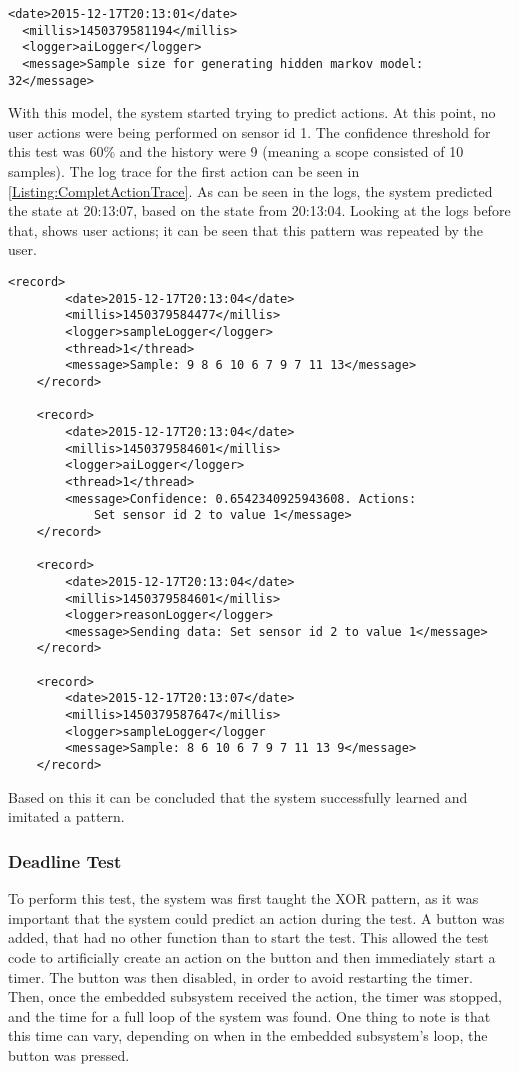\lstset{language=xml}
\begin{lstlisting}[label = Listing:MarkovGenLog, caption = Snippet of log from model generation]
  <date>2015-12-17T20:13:01</date>
  <millis>1450379581194</millis>
  <logger>aiLogger</logger>
  <message>Sample size for generating hidden markov model: 32</message>
\end{lstlisting}

With this model, the system started trying to predict actions. At this point, no user actions were being performed on sensor id 1. The confidence threshold for this test was 60\% and the history were 9 (meaning a scope consisted of 10 samples). The log trace for the first action can be seen in \cref{Listing:CompletActionTrace}. As can be seen in the logs, the system predicted the state at 20:13:07, based on the state from 20:13:04. Looking at the logs before that, shows user actions; it can be seen that this pattern was repeated by the user.

\begin{lstlisting}[label = Listing:CompletActionTrace, caption = Snippets from different logs to show how the process of making an action]
    <record>
        <date>2015-12-17T20:13:04</date>
        <millis>1450379584477</millis>
        <logger>sampleLogger</logger>
        <thread>1</thread>
        <message>Sample: 9 8 6 10 6 7 9 7 11 13</message>
    </record>

    <record>
        <date>2015-12-17T20:13:04</date>
        <millis>1450379584601</millis>
        <logger>aiLogger</logger>
        <thread>1</thread>
        <message>Confidence: 0.6542340925943608. Actions:
            Set sensor id 2 to value 1</message>
    </record>

    <record>
        <date>2015-12-17T20:13:04</date>
        <millis>1450379584601</millis>
        <logger>reasonLogger</logger>
        <message>Sending data: Set sensor id 2 to value 1</message>
    </record>

    <record>
        <date>2015-12-17T20:13:07</date>
        <millis>1450379587647</millis>
        <logger>sampleLogger</logger
        <message>Sample: 8 6 10 6 7 9 7 11 13 9</message>
    </record>
\end{lstlisting}

Based on this it can be concluded that the system successfully learned and imitated a pattern.

\subsubsection{Deadline Test}
To perform this test, the system was first taught the XOR pattern, as it was important that the system could predict an action during the test. A button was added, that had no other function than to start the test. This allowed the test code to artificially create an action on the button and then immediately start a timer. The button was then disabled, in order to avoid restarting the timer. Then, once the embedded subsystem received the action, the timer was stopped, and the time for a full loop of the system was found. One thing to note is that this time can vary, depending on when in the embedded subsystem's loop, the button was pressed.

